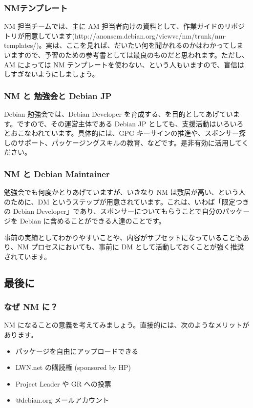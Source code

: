 \documentclass[mingoth,a4paper]{jsarticle}
\begin{document}
\subsubsection{NMテンプレート}

NM 担当チームでは、主に AM 担当者向けの資料として、作業ガイドのリポジトリが用意しています(http://anonscm.debian.org/viewvc/nm/trunk/nm-templates/)。実は、ここを見れば、だいたい何を聞かれるのかはわかってしまいますので、予習のための参考書としては最良のものだと思われます。ただし、AM によっては NM テンプレートを使わない、という人もいますので、盲信はしすぎないようにしましょう。

\subsubsection{NM と 勉強会と Debian JP}

Debian 勉強会では、Debian Developer を育成する、を目的としてあげています。ですので、その運営主体である Debian JP としても、支援活動はいろいろとおこなわれています。具体的には、GPG キーサインの推進や、スポンサー探しのサポート、パッケージングスキルの教育、などです。是非有効に活用してください。

\subsubsection{NM と Debian Maintainer}

勉強会でも何度かとりあげていますが、いきなり NM は敷居が高い、という人のために、DM というステップが用意されています。これは、いわば「限定つきの Debian Developer」であり、スポンサーについてもらうことで自分のパッケージを Debian に含めることができる人達のことです。

事前の実績としてわかりやすいことや、内容がサブセットになっていることもあり、NM プロセスにおいても、事前に DM として活動しておくことが強く推奨されています。

\subsection{最後に}

\subsubsection{なぜ NM に？}

NM になることの意義を考えてみましょう。直接的には、次のようなメリットがあります。

\begin{itemize}
\item パッケージを自由にアップロードできる
\item LWN.net の購読権 (sponsored by HP)
\item Project Leader や GR への投票
\item @debian.org メールアカウント
\end{itemize}
\end{document}
